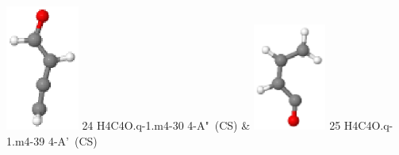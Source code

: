 \documentclass[10pt]{article}
\begin{document}
\begin{tabular}
\includegraphics[width=2.40000000000000000000cm]{H4C4O.q-1.m4-30.eps} \tiny{24 \hspace{1.20000000000000000000cm} H4C4O.q-1.m4-30 \hspace{5pt} 4-A"~(CS)} &
\includegraphics[width=2.40000000000000000000cm]{H4C4O.q-1.m4-39.eps} \tiny{25 \hspace{1.20000000000000000000cm} H4C4O.q-1.m4-39 \hspace{5pt} 4-A'~(CS)} 
\\
\end{tabular}
\end{document}
